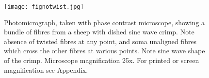 %

\begin{figure}[!h]
  \centering
  \texttt{[image: fignotwist.jpg]}
  \caption{Photomicrograph, taken with phase contrast microscope, showing a bundle of fibres from a sheep with dished sine wave crimp. Note absence of twisted fibres at any point, and soma unaligned fibres which cross the other fibres at various points. Note sine wave shape of the crimp. Microscope magnification 25x. For printed or screen magnification see Appendix. }
  \label{fig:notwist}
\end{figure}

%

